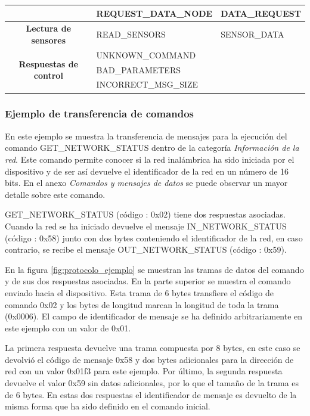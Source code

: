\begin{table}
\begin{center}
\begin{tabular}{c|l|l}
		& REQUEST\_DATA\_NODE & DATA\_REQUEST\\ %
		\midrule
		\textbf{Lectura de sensores} & 
		READ\_SENSORS & SENSOR\_DATA\\ %
		\midrule 
		\multirow{3}{*}{\textbf{Respuestas de control}} &
		UNKNOWN\_COMMAND\\
		& BAD\_PARAMETERS\\
		& INCORRECT\_MSG\_SIZE\\
		\bottomrule
		\end{tabular}
	\end{center}
\end{table}

\subsubsection{Ejemplo de transferencia de comandos}

En este ejemplo se muestra la transferencia de mensajes para la ejecución del comando GET\_NETWORK\_STATUS dentro de la categoría \textit{Información de la red}. Este comando permite conocer si la red inalámbrica ha sido iniciada por el dispositivo y de ser así devuelve el identificador de la red en un número de 16 bits. En el anexo \textit{Comandos y mensajes de datos} se puede observar un mayor detalle sobre este comando. 

GET\_NETWORK\_STATUS (código : 0x02) tiene dos respuestas asociadas. Cuando la red se ha iniciado devuelve el mensaje IN\_NETWORK\_STATUS (código : 0x58) junto con dos bytes conteniendo el identificador de la red, en caso contrario, se recibe el mensaje OUT\_NETWORK\_STATUS (código : 0x59). 

En la figura \ref{fig:protocolo_ejemplo} se muestran las tramas de datos del comando y de sus dos respuestas asociadas. En la parte superior se muestra el comando enviado hacia el dispositivo. Esta trama de 6 bytes transfiere el código de comando 0x02 y los bytes de longitud marcan la longitud de toda la trama (0x0006). El campo de identificador de mensaje se ha definido arbitrariamente en este ejemplo con un valor de 0x01.

La primera respuesta devuelve una trama compuesta por 8 bytes, en este caso se devolvió el código de mensaje 0x58 y dos bytes adicionales para la dirección de red con un valor 0x01f3 para este ejemplo. Por último, la segunda respuesta devuelve el valor 0x59 sin datos adicionales, por lo que el tamaño de la trama es de 6 bytes. En estas dos respuestas el identificador de mensaje es devuelto de la misma forma que ha sido definido en el comando inicial.   


